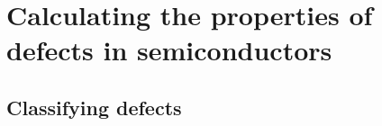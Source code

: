 









\clearpage

\section{Calculating the properties of defects in semiconductors}



\subsection{Classifying defects}


